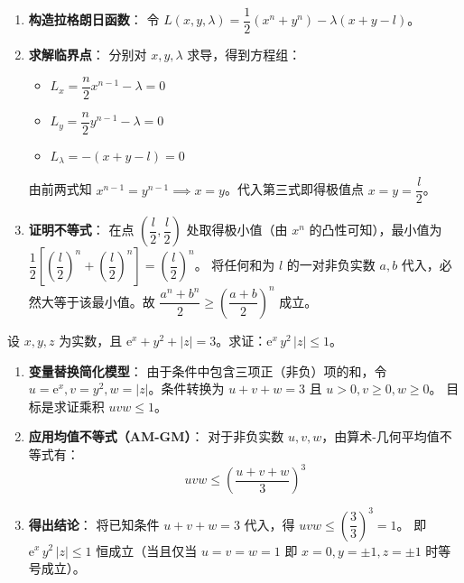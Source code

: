 \documentclass[lang=cn,11pt]{elegantbook}
\begin{document}
\begin{solution}
\begin{enumerate}
  \item \textbf{构造拉格朗日函数}：
  令 $L(x,y,\lambda) = \dfrac{1}{2}(x^n+y^n) - \lambda(x+y-l)$。
  \item \textbf{求解临界点}：
  分别对 $x,y,\lambda$ 求导，得到方程组：
  \begin{itemize}
    \item $L_x = \dfrac{n}{2}x^{n-1} - \lambda = 0$
    \item $L_y = \dfrac{n}{2}y^{n-1} - \lambda = 0$
    \item $L_\lambda = -(x+y-l) = 0$
  \end{itemize}
  由前两式知 $x^{n-1} = y^{n-1} \implies x=y$。代入第三式即得极值点 $x=y=\dfrac{l}{2}$。
  \item \textbf{证明不等式}：
  在点 $\left(\dfrac{l}{2}, \dfrac{l}{2}\right)$ 处取得极小值（由 $x^n$ 的凸性可知），最小值为 $\dfrac{1}{2}\left[\left(\dfrac{l}{2}\right)^n + \left(\dfrac{l}{2}\right)^n\right] = \left(\dfrac{l}{2}\right)^n$。
  将任何和为 $l$ 的一对非负实数 $a, b$ 代入，必然大等于该最小值。故 $\dfrac{a^n+b^n}{2} \geq \left(\dfrac{a+b}{2}\right)^n$ 成立。
\end{enumerate}
\end{solution}



\begin{exercise}[含绝对值项的不等式证明]
设 $x,y,z$ 为实数，且 $\mathrm{e}^x+y^2+|z|=3$。求证：$\mathrm{e}^x\,y^2\,|z|\leq 1$。
\end{exercise}

\begin{solution}
\begin{enumerate}
  \item \textbf{变量替换简化模型}：
  由于条件中包含三项正（非负）项的和，令 $u=\mathrm{e}^x, v=y^2, w=|z|$。条件转换为 $u+v+w=3$ 且 $u>0, v \geq 0, w \geq 0$。
  目标是求证乘积 $uvw \leq 1$。
  \item \textbf{应用均值不等式（AM-GM）}：
  对于非负实数 $u, v, w$，由算术-几何平均值不等式有：
  \[
  uvw \leq \left(\frac{u+v+w}{3}\right)^3
  \]
  \item \textbf{得出结论}：
  将已知条件 $u+v+w=3$ 代入，得 $uvw \leq \left(\dfrac{3}{3}\right)^3 = 1$。
  即 $\mathrm{e}^x\,y^2\,|z| \leq 1$ 恒成立（当且仅当 $u=v=w=1$ 即 $x=0, y=\pm 1, z=\pm 1$ 时等号成立）。
\end{enumerate}
\end{solution}
\end{document}
